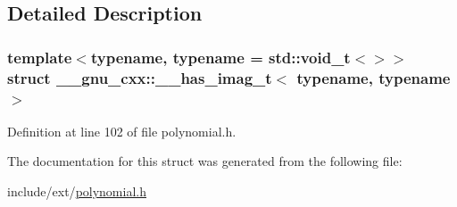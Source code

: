 \subsection{Detailed Description}
\subsubsection*{template$<$typename, typename = std\+::void\+\_\+t$<$$>$$>$\newline
struct \+\_\+\+\_\+gnu\+\_\+cxx\+::\+\_\+\+\_\+has\+\_\+imag\+\_\+t$<$ typename, typename $>$}



Definition at line 102 of file polynomial.\+h.



The documentation for this struct was generated from the following file\+:\begin{DoxyCompactItemize}
\item 
include/ext/\hyperlink{polynomial_8h}{polynomial.\+h}\end{DoxyCompactItemize}
